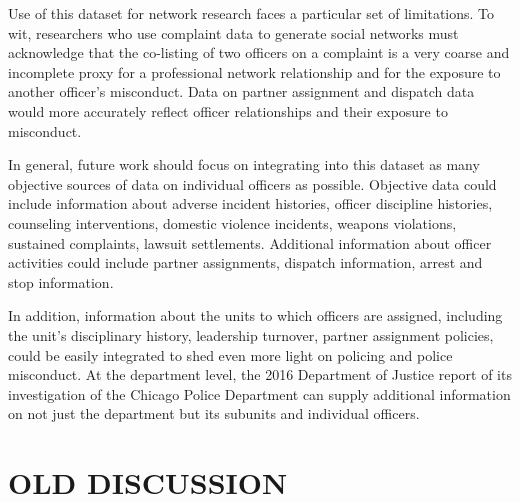 Use of this dataset for network research faces a particular set of limitations.
To wit, researchers who use complaint data to generate social networks must
acknowledge that the co-listing of two officers on a complaint is a very coarse
and incomplete proxy for a professional network relationship and for the
exposure to another officer’s misconduct. Data on partner assignment and
dispatch data would more accurately reflect officer relationships and their
exposure to misconduct. 

In general, future work should focus on integrating into this dataset as many
objective sources of data on individual officers as possible. Objective data
could include information about adverse incident histories, officer discipline
histories, counseling interventions, domestic violence incidents, weapons
violations, sustained complaints, lawsuit settlements. Additional information
about officer activities could include partner assignments, dispatch
information, arrest and stop information. 

In addition, information about the units to which officers are assigned,
including the unit’s disciplinary history, leadership turnover, partner
assignment policies, could be easily integrated to shed even more light on
policing and police misconduct. At the department level, the 2016 Department of
Justice report of its investigation of the Chicago Police Department can supply
additional information on not just the department but its subunits and
individual officers.


\section{OLD DISCUSSION}


